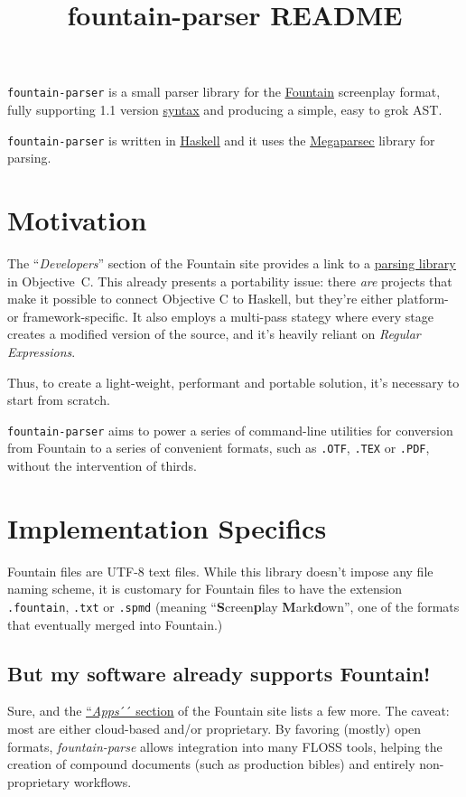 \documentclass[12pt]{article}
\newcommand{\link}[2]{\underline{\color{darkblue}\href{#1}{#2}}}
\begin{document}
\title{\textbf{fountain-parser README}}
\author{}
\date{}
\maketitle

\texttt{fountain-parser} is a small parser library for the
\link{https://fountain.io/}{\textsf{Fountain}} screenplay format,
fully supporting 1.1 version
\link{https://fountain.io/syntax/}{syntax} and
producing a simple, easy to grok \textsf{AST}.

\texttt{fountain-parser} is written in
\link{https://haskell.org}{\textsf{Haskell}} and it uses the
\link{https://hackage.haskell.org/package/megaparsec}{\textsf{Megaparsec}}
library for parsing.

\section{Motivation}
The ``\emph{Developers}'' section of the Fountain site provides a
link to a
\link{https://github.com/nyousefi/Fountain}{parsing library}
in \textsf{Objective~C}. This already presents a portability
issue: there \emph{are} projects that make it possible to connect
Objective C to Haskell, but they're either platform- or
framework-specific.  It also employs a multi-pass stategy where
every stage creates a modified version of the source, and it's
heavily reliant on \emph{Regular Expressions}.

Thus, to create a light-weight, performant and portable
solution, it's necessary to start from scratch.

\texttt{fountain-parser} aims to power a series of command-line
utilities for conversion from Fountain to a series of convenient
formats, such as \texttt{.OTF}, \texttt{.TEX} or \texttt{.PDF},
without the intervention of thirds.

\section{Implementation Specifics}
Fountain files are \textsf{UTF-8} text files. While this library
doesn't impose any file naming scheme, it is customary for Fountain
files to have the extension \texttt{.fountain}, \texttt{.txt} or
\texttt{.spmd} (meaning
``\textbf{S}creen\textbf{p}lay \textbf{M}ark\textbf{d}own'',
one of the formats that eventually merged into Fountain.)

\subsection{But my software already supports Fountain!}
Sure, and the \link{https://fountain.io/apps/}{``\emph{Apps}´´
  section} of the Fountain site lists a few more. The caveat: most
are either cloud-based and/or proprietary. By favoring (mostly)
open formats, \emph{fountain-parse} allows integration into
many FLOSS tools, helping the creation of compound documents
(such as production bibles) and entirely non-proprietary
workflows.
\end{document}
